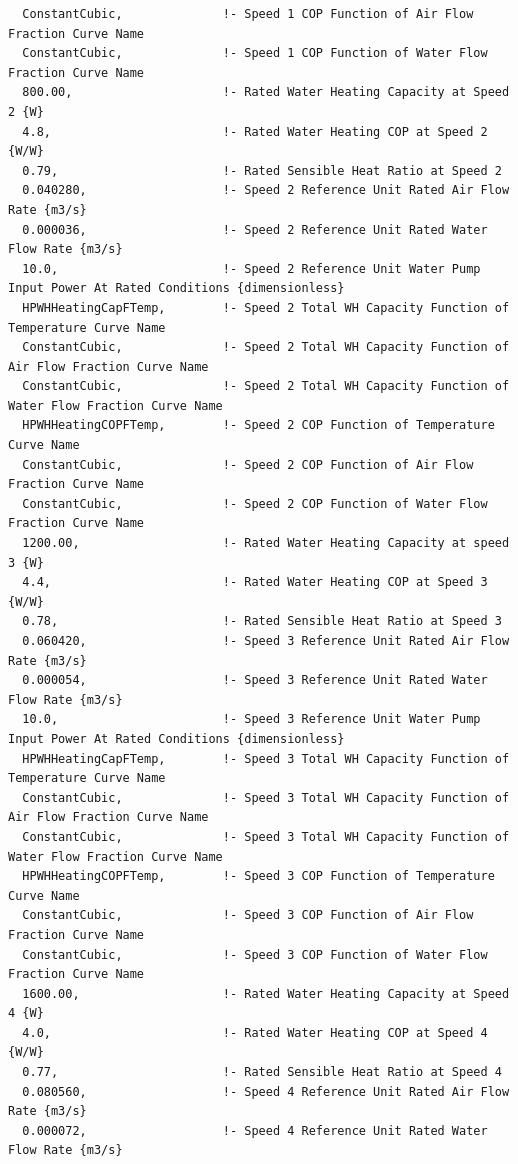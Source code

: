 \begin{lstlisting}
  ConstantCubic,              !- Speed 1 COP Function of Air Flow Fraction Curve Name
  ConstantCubic,              !- Speed 1 COP Function of Water Flow Fraction Curve Name
  800.00,                     !- Rated Water Heating Capacity at Speed 2 {W}
  4.8,                        !- Rated Water Heating COP at Speed 2 {W/W}
  0.79,                       !- Rated Sensible Heat Ratio at Speed 2
  0.040280,                   !- Speed 2 Reference Unit Rated Air Flow Rate {m3/s}
  0.000036,                   !- Speed 2 Reference Unit Rated Water Flow Rate {m3/s}
  10.0,                       !- Speed 2 Reference Unit Water Pump Input Power At Rated Conditions {dimensionless}
  HPWHHeatingCapFTemp,        !- Speed 2 Total WH Capacity Function of Temperature Curve Name
  ConstantCubic,              !- Speed 2 Total WH Capacity Function of Air Flow Fraction Curve Name
  ConstantCubic,              !- Speed 2 Total WH Capacity Function of Water Flow Fraction Curve Name
  HPWHHeatingCOPFTemp,        !- Speed 2 COP Function of Temperature Curve Name
  ConstantCubic,              !- Speed 2 COP Function of Air Flow Fraction Curve Name
  ConstantCubic,              !- Speed 2 COP Function of Water Flow Fraction Curve Name
  1200.00,                    !- Rated Water Heating Capacity at speed 3 {W}
  4.4,                        !- Rated Water Heating COP at Speed 3 {W/W}
  0.78,                       !- Rated Sensible Heat Ratio at Speed 3
  0.060420,                   !- Speed 3 Reference Unit Rated Air Flow Rate {m3/s}
  0.000054,                   !- Speed 3 Reference Unit Rated Water Flow Rate {m3/s}
  10.0,                       !- Speed 3 Reference Unit Water Pump Input Power At Rated Conditions {dimensionless}
  HPWHHeatingCapFTemp,        !- Speed 3 Total WH Capacity Function of Temperature Curve Name
  ConstantCubic,              !- Speed 3 Total WH Capacity Function of Air Flow Fraction Curve Name
  ConstantCubic,              !- Speed 3 Total WH Capacity Function of Water Flow Fraction Curve Name
  HPWHHeatingCOPFTemp,        !- Speed 3 COP Function of Temperature Curve Name
  ConstantCubic,              !- Speed 3 COP Function of Air Flow Fraction Curve Name
  ConstantCubic,              !- Speed 3 COP Function of Water Flow Fraction Curve Name
  1600.00,                    !- Rated Water Heating Capacity at Speed 4 {W}
  4.0,                        !- Rated Water Heating COP at Speed 4 {W/W}
  0.77,                       !- Rated Sensible Heat Ratio at Speed 4
  0.080560,                   !- Speed 4 Reference Unit Rated Air Flow Rate {m3/s}
  0.000072,                   !- Speed 4 Reference Unit Rated Water Flow Rate {m3/s}

\end{lstlisting}
